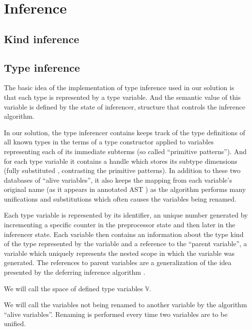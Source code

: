 \section{Inference}



\subsection{Kind inference}


\subsection{Type inference}

The basic idea of the implementation of type inference used in our solution is that each type is represented by a type variable. And the semantic value of this variable is defined by the state of inferencer, structure that controls the inference algorithm.

In our solution, the type inferencer contains keeps track of the type definitions of all known types in the terms of a type constructor applied to variables representing each of its immediate subterms (so called ``primitive patterns''). And for each type variable it contains a handle which stores its subtype dimensions (fully substituted , contrasting the primitive patterns). In addition to these two databases of ``alive variables'', it also keeps the mapping from each variable's original name (as it appears in annotated AST ) as the algorithm performs many unifications and substitutions which often causes the variables being renamed.

\begin{defn}
    Each type variable is represented by its identifier, an unique number generated by incrementing a specific counter in the preprocessor state  and then later in the inferencer state. Each variable then contains an information about the type kind of the type represented by the variable  and a reference to the ``parent variable'', a variable which uniquely represents the nested scope in which the variable was generated. The references to parent variables are a generalization of the idea presented by the deferring inference algorithm  .
    
    We will call the space of defined type variables $\mathbb{V}$.

    We will call the variables not being renamed to another variable by the algorithm ``alive variables''. Renaming is performed every time two variables are to be unified.
\end{defn}


